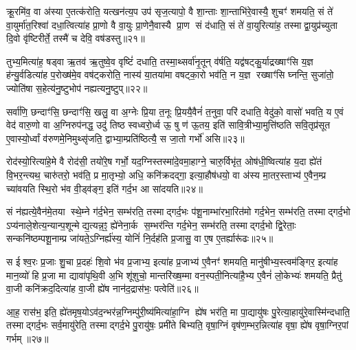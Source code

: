 {\anuvakamend[{ऐव प॒शूनिति॑ गृणाति होत॒रिति॑ स॒प्तविꣳ॑शतिश्च॥४॥}]}

क्रू॒रमि॑व॒ वा अ॑स्या ए॒तत्क॑रोति॒ यत्खन॑त्य॒प उप॑ सृज॒त्यापो॒ वै शा॒न्ताः शा॒न्ताभि॑रे॒वास्यै॒ शुचꣳ॑ शमयति॒ सं ते॑ वा॒युर्मा॑त॒रिश्वा॑ दधा॒त्वित्या॑ह प्रा॒णो वै वा॒युः प्रा॒णेनै॒वास्यै प्रा॒ण सं द॑धाति॒ सं ते॑ वा॒युरित्या॑ह॒ तस्माद्वा॒युप्र॑च्युता दि॒वो वृ॑ष्टिरीर्ते॒ तस्मै॑ च देवि॒ वष॑डस्तु॥२१॥

तुभ्य॒मित्या॑ह॒ षड्वा ऋ॒तव॑ ऋ॒तुष्वे॒व वृष्टिं॑ दधाति॒ तस्मा॒थ्सर्वा॑नृ॒तून् व॑र्\mbox{}षति॒ यद्व॑षट्कु॒र्याद्रख्षाꣳ॑सि य॒ज्ञ ह॑न्यु॒र्वडित्या॑ह प॒रोख्ष॑मे॒व वष॑ट्करोति॒ नास्य॑ या॒तया॑मा वषट्का॒रो भव॑ति॒ न य॒ज्ञ रख्षाꣳ॑सि घ्नन्ति॒ सुजा॑तो॒ ज्योति॑षा स॒हेत्य॑नु॒ष्टुभोप॑ नह्यत्यनु॒ष्टुप्॥२२॥

सर्वा॑णि॒ छन्दाꣳ॑सि॒ छन्दाꣳ॑सि॒ खलु॒ वा अ॒ग्नेः प्रि॒या त॒नूः प्रि॒ययै॒वैनं॑ त॒नुवा॒ परि॑ दधाति॒ वेदु॑को॒ वासो॑ भवति॒ य ए॒वं वेद॑ वारु॒णो वा अ॒ग्निरुप॑नद्ध॒ उदु॑ तिष्ठ स्वध्वरो॒र्ध्व ऊ॒ षु ण॑ ऊ॒तय॒ इति॑ सावि॒त्रीभ्या॒मुत्ति॑ष्ठति सवि॒तृप्र॑सूत ए॒वास्यो॒र्ध्वां व॑रुणमे॒निमुथ्सृ॑जति॒ द्वाभ्या॒म्प्रति॑ष्ठित्यै॒ स जा॒तो गर्भो॑ असि॥२३॥

रोद॑स्यो॒रित्या॑हे॒मे वै रोद॑सी॒ तयो॑रे॒ष गर्भो॒ यद॒ग्निस्तस्मा॑दे॒वमा॒हाग्ने॒ चारु॒र्विभृ॑त॒ ओष॑धी॒ष्वित्या॑ह य॒दा ह्ये॑तं वि॒भर॒न्त्यथ॒ चारु॑तरो॒ भव॑ति॒ प्र मा॒तृभ्यो॒ अधि॒ कनि॑क्रदद्गा॒ इत्या॒हौष॑धयो॒ वा अ॑स्य मा॒तर॒स्ताभ्य॑ ए॒वैन॒म्प्र च्या॑वयति स्थि॒रो भ॑व वी॒ड्व॑ङ्ग॒ इति॑ गर्द॒भ आ सा॑दयति॥२४॥

सं न॑ह्यत्ये॒वैन॑मे॒तया स्थे॒म्ने ग॑र्द॒भेन॒ सम्भ॑रति॒ तस्माद्गर्द॒भः प॑शू॒नाम्भा॑रभा॒रित॑मो गर्द॒भेन॒ सम्भ॑रति॒ तस्माद्गर्द॒भो ऽप्य॑नाले॒शेत्य॒न्यान्प॒शून्मेद्य॒त्यन्न॒ꣵ॒ ह्ये॑नेना॒र्क स॒म्भर॑न्ति गर्द॒भेन॒ सम्भ॑रति॒ तस्माद्गर्द॒भो द्वि॒रेताः॒ सन्कनि॑ष्ठम्पशू॒नाम्प्र जा॑यते॒ऽग्निर्ह्य॑स्य॒ योनिं॑ नि॒र्दह॑ति प्र॒जासु॒ वा ए॒ष ए॒तर्\mbox{}ह्यारू॑ढः॥२५॥

स ईश्व॒रः प्र॒जाः शु॒चा प्र॒दहः॑ शि॒वो भ॑व प्र॒जाभ्य॒ इत्या॑ह प्र॒जाभ्य॑ ए॒वैनꣳ॑ शमयति॒ मानु॑षीभ्य॒स्त्वम॑ङ्गिर॒ इत्या॑ह मान॒व्यो॑ हि प्र॒जा मा द्यावा॑पृथि॒वी अ॒भि शू॑शुचो॒ मान्तरि॑ख्ष॒म्मा वन॒स्पती॒नित्या॑है॒भ्य ए॒वैनं॑ लो॒केभ्यः॑ शमयति॒ प्रैतु॑ वा॒जी कनि॑क्रद॒दित्या॑ह वा॒जी ह्ये॑ष नान॑द॒द्रास॑भः॒ पत्वेति॑॥२६॥

आ॒ह॒ रास॑भ॒ इति॒ ह्ये॑तमृष॒योऽव॑द॒न्भर॑न्न॒ग्निम्पु॑री॒ष्य॑मित्या॑हा॒ग्नि ह्ये॑ष भर॑ति॒ मा पा॒द्यायु॑षः पु॒रेत्या॒हायु॑रे॒वास्मि॑न्दधाति॒ तस्माद्गर्द॒भः सर्व॒मायु॑रेति॒ तस्माद्गर्द॒भे पु॒रायु॑षः॒ प्रमी॑ते बिभ्यति॒ वृषा॒ग्निं वृष॑ण॒म्भर॒न्नित्या॑ह वृषा॒ ह्ये॑ष वृषा॒ग्निर॒पां गर्भम्॥२७॥

